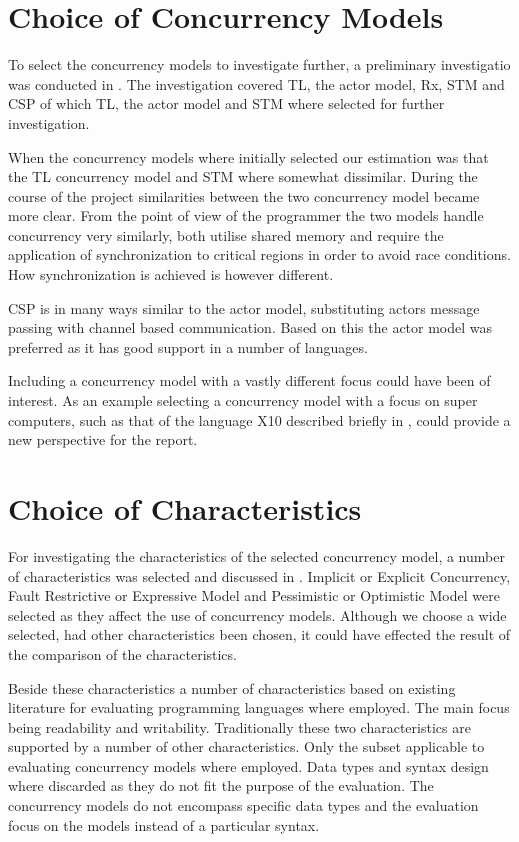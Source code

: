 \section{Choice of Concurrency Models}
To select the concurrency models to investigate further, a preliminary investigatio was conducted in . The investigation covered \ac{TL}, the actor model, \ac{Rx}, \ac{STM} and \ac{CSP} of which \ac{TL}, the actor model and \ac{STM} where selected for further investigation.

When the concurrency models where initially selected our estimation was that the \ac{TL} concurrency model and \ac{STM} where somewhat dissimilar. During the course of the project similarities between the two concurrency model became more clear. From the point of view of the programmer the two models handle concurrency very similarly, both utilise shared memory and require the application of synchronization to critical regions in order to avoid race conditions. How synchronization is achieved is however different.

\ac{CSP} is in many ways similar to the actor model, substituting actors message passing with channel based communication. Based on this the actor model was preferred as it has good support in a number of languages.

Including a concurrency model with a vastly different focus could have been of interest. As an example selecting a concurrency model with a focus on super computers, such as that of the language X10\cite{tardieu2014x10} described briefly in , could provide a new perspective for the report.

\section{Choice of Characteristics}
For investigating the characteristics of the selected concurrency model, a number of characteristics was selected and discussed in . Implicit or Explicit Concurrency, Fault Restrictive or Expressive Model and Pessimistic or Optimistic Model were selected as they affect the use of concurrency models. Although we choose a wide selected, had other characteristics been chosen, it could have effected the result of the comparison of the characteristics.

Beside these characteristics a number of characteristics based on existing literature for evaluating programming languages where employed. The main focus being readability and writability. Traditionally these two characteristics are supported by a number of other characteristics. Only the subset applicable to evaluating concurrency models where employed. Data types and syntax design where discarded as they do not fit the purpose of the evaluation. The concurrency models do not encompass specific data types and the evaluation focus on the models instead of a particular syntax.

